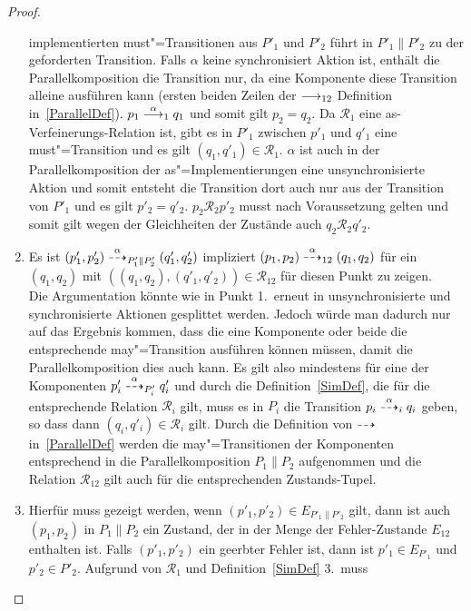 \begin{proof}
\begin{enumerate}
      implementierten must"=Transitionen aus $P'_1$ und $P'_2$ führt in
      $P'_1\|P'_2$ zu der geforderten Transition. Falls $\alpha$ keine
      synchronisiert Aktion ist, enthält die Parallelkomposition die Transition
      nur, da eine Komponente diese Transition alleine ausführen kann (ersten
      beiden Zeilen der $\must _{12}$ Definition in~\ref{ParallelDef}). \OBdA{}
      $p_1\must[\alpha]_1q_1$ und somit gilt $p_2=q_2$. Da $\mathcal{R}_1$ eine
      as-Verfeinerungs-Relation ist, gibt es in $P'_1$ zwischen $p'_1$ und
      $q'_1$ eine must"=Transition und es gilt $(q_1,q'_1)\in\mathcal{R}_1$.
      $\alpha$ ist auch in der Parallelkomposition der as"=Implementierungen
      eine unsynchronisierte Aktion und somit entsteht die Transition dort auch
      nur aus der Transition von $P'_1$ und es gilt $p'_2=q'_2$.
      $p_2\mathcal{R}_2p'_2$ musst nach Voraussetzung gelten und somit gilt
      wegen der Gleichheiten der Zustände auch $q_2\mathcal{R}_2q'_2$.
    \item Es ist $(p'_1,p'_2)\may[\alpha]_{P'_1\|P'_2}(q'_1,q'_2)$ impliziert
      $(p_1,p_2)\may[\alpha]_{12}(q_1,q_2)$ für ein $(q_1,q_2)$ mit
      $((q_1,q_2),(q'_1,q'_2))\in\mathcal{R}_{12}$ für diesen Punkt zu
      zeigen.\\
      Die Argumentation könnte wie in Punkt 1.\ erneut in unsynchronisierte und
      synchronisierte Aktionen gesplittet werden. Jedoch würde man dadurch nur
      auf das Ergebnis kommen, dass die eine Komponente oder beide die
      entsprechende may"=Transition ausführen können müssen, damit die
      Parallelkomposition dies auch kann. Es gilt also mindestens für eine der
      Komponenten $p'_i\may[\alpha]_{P'_i}q'_i$ und durch die
      Definition~\ref{SimDef}, die für die entsprechende Relation
      $\mathcal{R}_i$ gilt, muss es in $P_i$ die Transition
      $p_i\may[\alpha]_iq_i$ geben, so dass dann $(q_i,q'_i)\in\mathcal{R}_i$
      gilt. Durch die Definition von $\may$ in~\ref{ParallelDef} werden die
      may"=Transitionen der Komponenten entsprechend in die Parallelkomposition
      $P_1\|P_2$ aufgenommen und die Relation $\mathcal{R}_{12}$ gilt auch für
      die entsprechenden Zustands-Tupel.
    \item Hierfür muss gezeigt werden, wenn $(p'_1,p'_2)\in E_{P'_1\|P'_2}$
      gilt, dann ist auch $(p_1,p_2)$ in $P_1\|P_2$ ein Zustand, der in der
      Menge der Fehler-Zustande $E_{12}$ enthalten ist. Falls $(p'_1,p'_2)$
      ein geerbter Fehler ist, dann ist \oBdA $p'_1\in E_{P'_1}$ und $p'_2\in
      P'_2$. Aufgrund von $\mathcal{R}_1$ und Definition~\ref{SimDef} 3.\ muss

\end{enumerate}
\end{proof}
